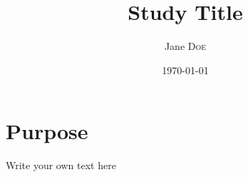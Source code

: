 \documentclass[11pt, a4paper]{article}
\title{Study Title}
\author{Jane \textsc{Doe}}
\date{\today}
\begin{document}




\section*{Purpose}

Write your own text here
\end{document}
